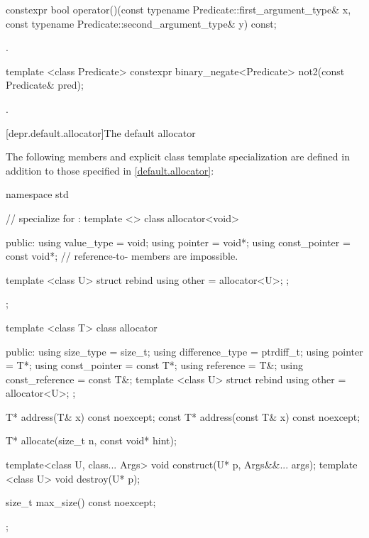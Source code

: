 %
\begin{itemdecl}
constexpr bool operator()(const typename Predicate::first_argument_type& x,
                          const typename Predicate::second_argument_type& y) const;
\end{itemdecl}

\begin{itemdescr}
\pnum \returns {}.
\end{itemdescr}

%
\begin{itemdecl}
template <class Predicate>
  constexpr binary_negate<Predicate> not2(const Predicate& pred);
\end{itemdecl}

\begin{itemdescr}
\pnum \returns {}.
\end{itemdescr}

[depr.default.allocator]{The default allocator}

\pnum
The following members and explicit class template specialization are defined in
addition to those specified in \ref{default.allocator}:

%
\begin{codeblock}
namespace std {
  // specialize for :
  template <> class allocator<void> {
  public:
    using value_type    = void;
    using pointer       = void*;
    using const_pointer = const void*;
    // reference-to- members are impossible.

    template <class U> struct rebind { using other = allocator<U>; };
  };

  template <class T> class allocator {
   public:
    using size_type       = size_t;
    using difference_type = ptrdiff_t;
    using pointer         = T*;
    using const_pointer   = const T*;
    using reference       = T&;
    using const_reference = const T&;
    template <class U> struct rebind { using other = allocator<U>; };

    T* address(T& x) const noexcept;
    const T* address(const T& x) const noexcept;

    T* allocate(size_t n, const void* hint);

    template<class U, class... Args>
      void construct(U* p, Args&&... args);
    template <class U>
      void destroy(U* p);

    size_t max_size() const noexcept;
  };
}
\end{codeblock}

